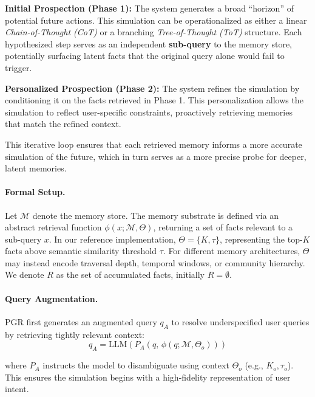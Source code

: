 \squishlist
    \item \textbf{Initial Prospection (Phase 1):} The system generates a broad ``horizon'' of potential future actions. This simulation can be operationalized as either a linear \textit{Chain-of-Thought (CoT)} or a branching \textit{Tree-of-Thought (ToT)} structure. Each hypothesized step serves as an independent \textbf{sub-query} to the memory store, potentially surfacing latent facts that the original query alone would fail to trigger. 
    \item \textbf{Personalized Prospection (Phase 2):} The system refines the simulation by conditioning it on the facts retrieved in Phase 1. This personalization allows the simulation to reflect user-specific constraints, proactively retrieving memories that match the refined context.
\squishend

This iterative loop ensures that each retrieved memory informs a more accurate simulation of the future, which in turn serves as a more precise probe for deeper, latent memories. 

\paragraph{Formal Setup.}
Let $\mathcal{M}$ denote the memory store. 
The memory substrate is defined via an abstract retrieval function $\phi(x; \mathcal{M}, \Theta)$, returning a set of facts relevant to a sub-query $x$. In our reference implementation, $\Theta = \{K, \tau\}$, representing the top-$K$ facts above semantic similarity threshold $\tau$. For different memory architectures, $\Theta$ may instead encode traversal depth, temporal windows, or community hierarchy. We denote $R$ as the set of accumulated facts, initially $R = \emptyset$.

\paragraph{Query Augmentation.} 
PGR first generates an augmented query $q_A$ to resolve underspecified user queries by retrieving tightly relevant context:
\vspace{-.8em}
\begin{equation}
q_A = \mathrm{LLM}(P_A(q,\, \phi(q;\mathcal{M}, \Theta_o)))
\end{equation}

where $P_A$ instructs the model to disambiguate using context $\Theta_o$ (e.g., $K_o, \tau_o$). This ensures the simulation begins with a high-fidelity representation of user intent.

